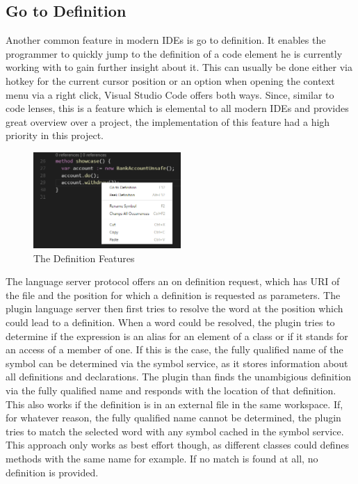 \subsection{Go to Definition} \label{gotodefinition}
Another common feature in modern IDEs is go to definition. It enables the programmer to quickly jump to the definition of a code element he is currently working with to gain further insight about it. This can usually be done either via hotkey for the current cursor position or an option when opening the context menu via a right click, Visual Studio Code offers both ways.\newline
Since, similar to code lenses, this is a feature which is elemental to all modern IDEs and provides great overview over a project, the implementation of this feature had a high priority in this project. \newline
 \begin{figure}[H]
	\centering
	\includegraphics[width=0.5\textwidth]{img/goToDefinition}
	\caption{The Definition Features}
	\label{fig:gotodefinition}
\end{figure}
The language server protocol offers an on definition request, which has URI of the file and the position for which a definition is requested as parameters. The plugin language server then first tries to resolve the word at the position which could lead to a definition. When a word could be resolved, the plugin tries to determine if the expression is an alias for an element of a class or if it stands for an access of a member of one. If this is the case, the fully qualified name of the symbol can be determined via the symbol service, as it stores information about all definitions and declarations. The plugin than finds the unambigious definition via the fully qualified name and responds with the location of that definition. This also works if the definition is in an external file in the same workspace. \newline
If, for whatever reason, the fully qualified name cannot be determined, the plugin tries to match the selected word with any symbol cached in the symbol service. This approach only works as best effort though, as different classes could defines methods with the same name for example. If no match is found at all, no definition is provided. \newline
